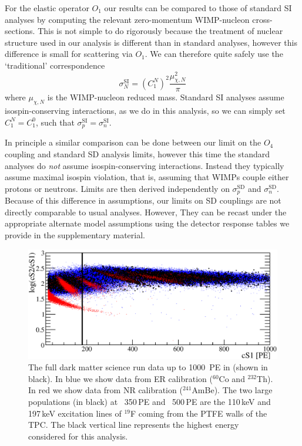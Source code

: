 For the elastic operator $O_1$ our results can be compared to those of standard SI analyses by computing the relevant zero-momentum WIMP-nucleon cross-sections. This is not simple to do rigorously because the treatment of nuclear structure used in our analysis is different than in standard analyses, however this difference is small for scattering via $O_1$. We can therefore quite safely use the `traditional' correspondence~\cite{DeSimone:2016fbz}
%
\begin{equation}
\sigma_{N}^\mathrm{SI} = \left(C^N_1\right)^2 \frac{\mu_{\chi,N}^2}{\pi}
\end{equation}
%
where $\mu_{\chi,N}$ is the WIMP-nucleon reduced mass. Standard SI analyses assume isospin-conserving interactions, as we do in this analysis, so we can simply set $C^N_1 = C^0_1$, such that $\sigma_{p}^\mathrm{SI}=\sigma_{n}^\mathrm{SI}$. 

In principle a similar comparison can be done between our limit on the $O_4$ coupling and standard SD analysis limits, however this time the standard analyses do {\em not} assume isospin-conserving interactions. Instead they typically assume maximal isospin violation, that is, assuming that WIMPs couple either protons or neutrons. Limits are then derived independently on $\sigma_{p}^\mathrm{SD}$ and $\sigma_{n}^\mathrm{SD}$. Because of this difference in assumptions, our limits on SD couplings are not directly comparable to usual analyses. However, They can be recast under the appropriate alternate model assumptions using the detector response tables we provide in the supplementary material.
 

\begin{figure}
\centerline{\includegraphics[width=1.\linewidth]
{Figures/allDataFullScale.eps}}
\caption{The full \Xehund{} dark matter science run data up to 1000~PE in \cSi{} (shown in black). In blue we show data from ER calibration ($^{60}$Co and $^{232}$Th). In red we show data from NR calibration ($^{241}$AmBe). The two large populations (in black) at ~350\,PE and ~500\,PE are the 110\,keV and 197\,keV excitation lines of $^{19}$F coming from the PTFE walls of the TPC. The black vertical line represents the highest energy considered for this analysis.
}
\label{fig:eft_1000}
\end{figure}  




